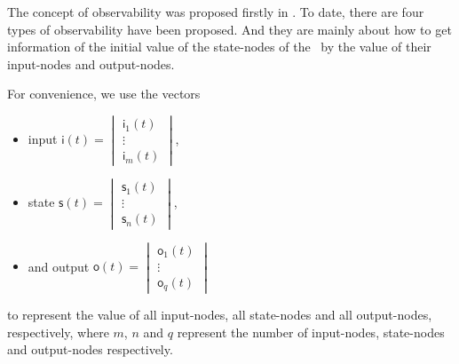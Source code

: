 
The concept of observability was proposed firstly in \cite{cheng2009controllability}. To date, there are four types of observability have been proposed. And they are mainly about how to get  information of the initial value of the state-nodes of the \BCNs\ by the value of their input-nodes and output-nodes. 

For convenience, we use the vectors
\begin{itemize}
	\item input $\mathsf{i}(t)=\begin{vmatrix}\mathsf{i}_1(t)\\ \vdots \\\mathsf{i}_m(t)\end{vmatrix}$,
	\item state $\mathsf{s}(t)=\begin{vmatrix}\mathsf{s}_1(t)\\ \vdots \\\mathsf{s}_n(t)\end{vmatrix}$,
	\item and output $\mathsf{o}(t)=\begin{vmatrix}\mathsf{o}_1(t)\\ \vdots \\\mathsf{o}_q(t)\end{vmatrix}$
\end{itemize}
 to represent the value of all input-nodes, all state-nodes and all output-nodes, respectively, where $m$, $n$ and $q$ represent the number of input-nodes, state-nodes and output-nodes respectively. 
 
